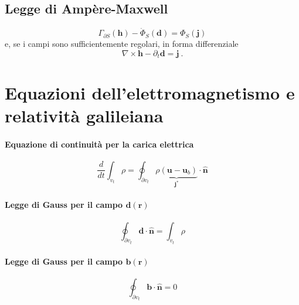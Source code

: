 \subsection{Legge di Ampère-Maxwell}
\begin{equation}
    \Gamma_{\partial S}(\mathbf{h}) - \dot{\Phi}_{S}(\mathbf{d}) = \Phi_{S}(\mathbf{j})
\end{equation}
e, se i campi sono sufficientemente regolari, in forma differenziale
\begin{equation}
    \nabla \times \mathbf{h} - \partial_t \mathbf{d} = \mathbf{j} \ .
\end{equation}



\section{Equazioni dell'elettromagnetismo e relatività galileiana}

\paragraph{Equazione di continuità per la carica elettrica}
\begin{equation}
    \dfrac{d}{dt} \int_{v_t}  \rho = \oint_{\partial v_t} \underbrace{\rho (\mathbf{u} - \mathbf{u}_b)}_{\mathbf{j}^*} \cdot \mathbf{\hat{n}}
\end{equation}
\paragraph{Legge di Gauss per il campo $\mathbf{d}(\mathbf{r})$}
\begin{equation}
    \oint_{\partial v_t} \mathbf{d} \cdot \mathbf{\hat{n}} = \int_{v_t} \rho
\end{equation}
\paragraph{Legge di Gauss per il campo $\mathbf{b}(\mathbf{r})$}
\begin{equation}
    \oint_{\partial v_t} \mathbf{b} \cdot \mathbf{\hat{n}} = 0
\end{equation}
